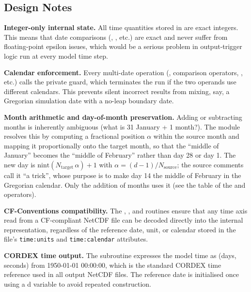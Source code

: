 \subsection{Design Notes}
\label{subsec:date_design}

\textbf{Integer-only internal state.} All time quantities stored in
 are exact integers. This means that date
comparisons (\code{==}, \code{<}, etc.) are exact and never suffer from
floating-point epsilon issues, which would be a serious problem in
output-trigger logic run at every model time step.

\textbf{Calendar enforcement.} Every multi-date operation (\code{-},
comparison operators, , etc.) calls the private
 guard, which terminates the run if the two operands use
different calendars. This prevents silent incorrect results from mixing,
say, a Gregorian simulation date with a no-leap boundary date.

\textbf{Month arithmetic and day-of-month preservation.} Adding or subtracting
months is inherently ambiguous (what is 31 January + 1 month?). The module
resolves this by computing a fractional position $\alpha$ within the source
month and mapping it proportionally onto the target month, so that the
``middle of January'' becomes the ``middle of February'' rather than day 28
or day 1. The new day is $\text{nint}(N_\text{target}\,\alpha) + 1$ with
$\alpha = (d - 1)/N_\text{source}$; the source comments call it ``a trick'',
whose purpose is to make day 14 the middle of February in the Gregorian
calendar. Only the addition of months uses it (see the table of the
\code{+} and \code{-} operators).

\textbf{CF-Conventions compatibility.} The ,
, and  routines ensure that any
time axis read from a CF-compliant NetCDF file can be decoded directly into
the internal representation, regardless of the reference date, unit, or
calendar stored in the file's \texttt{time:units} and
\texttt{time:calendar} attributes.

\textbf{CORDEX time output.} The  subroutine expresses the
model time as (days, seconds) from 1950-01-01 00:00:00, which is the standard
CORDEX time reference used in all output NetCDF files. The reference date is
initialised once using a d variable to avoid repeated construction.

